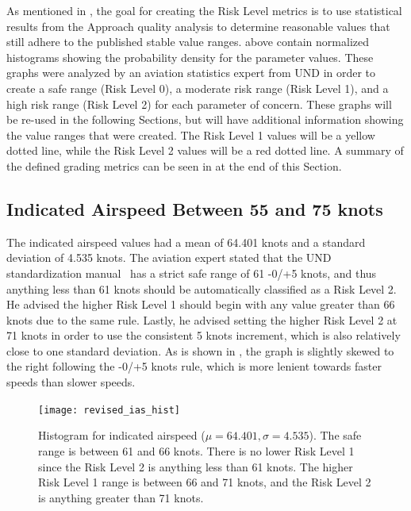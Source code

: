 	As mentioned in , the goal for creating the Risk Level metrics is to use statistical results from the Approach quality analysis to determine reasonable values that still adhere to the published stable value ranges.   above contain normalized histograms showing the probability density for the parameter values.  These graphs were analyzed by an aviation statistics expert from UND in order to create a safe range (Risk Level 0), a moderate risk range (Risk Level 1), and a high risk range (Risk Level 2) for each parameter of concern.  These graphs will be re-used in the following Sections, but will have additional information showing the value ranges that were created.  The Risk Level 1 values will be a yellow dotted line, while the Risk Level 2 values will be a red dotted line.  A summary of the defined grading metrics can be seen in  at the end of this Section.
    
    	
    \subsection{Indicated Airspeed Between 55 and 75 knots}
    
          The indicated airspeed values had a mean of 64.401 knots and a standard deviation of 4.535 knots.  The aviation expert stated that the UND standardization manual~\cite{und_flight_manual} has a strict safe range of 61 -0/+5 knots, and thus anything less than 61 knots should be automatically classified as a Risk Level 2.  He advised the higher Risk Level 1 should begin with any value greater than 66 knots due to the same rule.  Lastly, he advised setting the higher Risk Level 2 at 71 knots in order to use the consistent 5 knots increment, which is also relatively close to one standard deviation.  As is shown in , the graph is slightly skewed to the right following the -0/+5 knots rule, which is more lenient towards faster speeds than slower speeds.

		\begin{figure}
			\centering
            \texttt{[image: revised\_ias\_hist]}
            \caption{Histogram for indicated airspeed ($\mu = 64.401, \sigma = 4.535$).  The safe range is between 61 and 66 knots.  There is no lower Risk Level 1 since the Risk Level 2 is anything less than 61 knots.  The higher Risk Level 1 range is between 66 and 71 knots, and the Risk Level 2 is anything greater than 71 knots.}
            \label{fig:revised_ias_hist}
		\end{figure}



